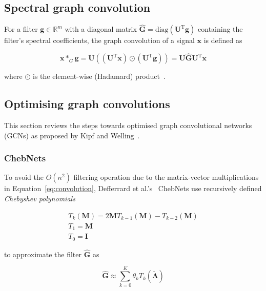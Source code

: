 
\subsection{Spectral graph convolution}

For a filter $\mathbf{g} \in \mathbb{R}^m$ with a diagonal matrix $\mathbf{\hat{G}} = \mathrm{diag}(\mathbf{U}^\mathrm{T}\mathbf{g})$ containing the filter's spectral coefficients, the graph convolution of a signal $\mathbf{x}$ is defined as

\begin{equation}
    \label{eq:convolution}
    \mathbf{x} *_G \mathbf{g} = \mathbf{U}((\mathbf{U}^\mathrm{T}\mathbf{x}) \odot (\mathbf{U}^\mathrm{T}\mathbf{g})) = \mathbf{U}\mathbf{\hat{G}}\mathbf{U}^\mathrm{T}\mathbf{x}
\end{equation}

where $\odot$ is the element-wise (Hadamard) product~\cite{wu2019simplifying}.

\subsection{Optimising graph convolutions}
This section reviews the steps towards optimised graph convolutional networks (GCNs) as proposed by Kipf and Welling~\cite{kipf2017semi}.

\subsubsection{ChebNets}
To avoid the $O(n^2)$ filtering operation due to the matrix-vector multiplications in Equation~\eqref{eq:convolution}, Defferrard et al.'s~\cite{defferrard2016convolutional} ChebNets use recursively defined \textit{Chebyshev polynomials}

\begin{gather}
    T_k(\mathbf{M}) = 2\mathbf{M}T_{k-1}(\mathbf{M}) - T_{k-2}(\mathbf{M}) \\
    T_1 = \mathbf{M} \\
    T_0 = \mathbf{I}
\end{gather}

to approximate the filter $\mathbf{\hat{G}}$ as 

\begin{equation}
    \mathbf{\hat{G}} \approx \sum_{k = 0}^{K} \theta_k T_k(\mathbf{\tilde{\Lambda}})
\end{equation}

